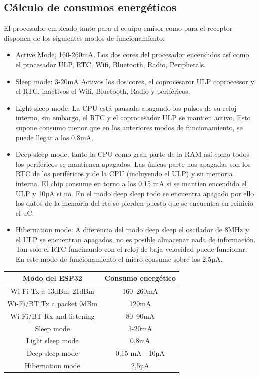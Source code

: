 \documentclass[a4paper ,12pt, onecolumn]{article}
\begin{document}
    \subsection{Cálculo de consumos energéticos}
            El procesador empleado tanto para el equipo emisor como para el receptor disponen de los siguientes modos de funcionamiento:
            \begin{itemize}
                \item  Active Mode, 160-260mA.  Los dos cores del procesador encendidos así como el procesador ULP,
                RTC, Wifi, Bluetooth, Radio, Peripherals.
                \item  Sleep mode: 3-20mA Activos los dos cores, el coprocesaror ULP coprocessor y el RTC, inactivos el 
                Wifi, Bluetooth, Radio y periféricos.
                \item  Light sleep mode: La CPU está pausada apagando los pulsos de su reloj interno, sin embargo, el RTC
                y el coprocesador ULP se mantien activo. Esto supone consumo menor que en los anteriores modos de funcionamiento,
                se puede llegar a los 0.8mA.
                \item Deep sleep mode, tanto la CPU como gran parte de la RAM así como todos los periféricos se mantienen 
                apagados. Las únicas parte nos apagadas son los RTC de los periféricos y de la CPU (incluyendo el ULP) y su
                memoria interna. El chip consume en torno a los 0.15 mA si se mantien encendido el ULP y  10µA si no.
                En el modo deep sleep todo se encuentra apagado por ello los datos de la memoria del rtc se pierden
                puesto que se encuentra en reinicio el uC.
                \item Hibernation mode: A diferencia del modo deep sleep el oscilador de 8MHz y el ULP se encuentran apagados,
                no es posible almacenar nada de información. Tan solo el RTC funcinando con el reloj de baja velocidad puede funcionar.
                En este modo de funcionamiento el micro consume sobre los 2.5µA.
            \end{itemize}
            \begin{center}
                \begin{tabular}{||c || c ||} 
                \hline
                Modo del ESP32  & Consumo energético  \\ [0.5ex] 
                \hline
                Wi-Fi Tx a 13dBm~21dBm & 160~260mA  \\ 
                Wi-Fi/BT Tx  a packet 0dBm	 & 120mA  \\
                Wi-Fi/BT Rx and listening & 80~90mA  \\
                Sleep mode &  3-20mA   \\
                Light sleep mode &0,8mA  \\
                Deep sleep mode &   0,15 mA - 10µA  \\
                Hibernation mode & 2,5µA  \\
                \hline
                \end{tabular}
            \end{center}
\end{document}
